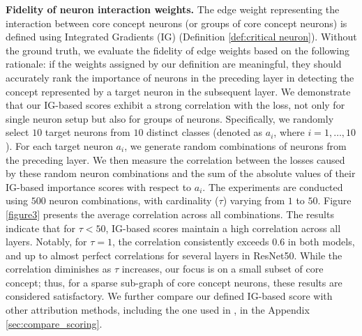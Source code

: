 \noindent \textbf{Fidelity of neuron interaction weights.}
\label{sec:edge_verification}
The edge weight representing the interaction between core concept neurons (or groups of core concept neurons) is defined using Integrated Gradients (IG) (Definition \ref{def:critical neuron}). Without the ground truth, we evaluate the fidelity of edge weights based on the following rationale: if the weights assigned by our definition are meaningful, they should accurately rank the importance of neurons in the preceding layer in detecting the concept represented by a target neuron in the subsequent layer.
We demonstrate that our IG-based scores exhibit a strong correlation with the loss, not only for single neuron setup but also for groups of neurons. Specifically, we randomly select $10$ target neurons from $10$ distinct classes (denoted as $a_i$, where $i = 1, \dots, 10$). For each target neuron $a_i$, we generate random combinations of neurons from the preceding layer. We then measure the correlation between the losses caused by these random neuron combinations and the sum of the absolute values of their IG-based importance scores with respect to $a_i$.
The experiments are conducted using $500$ neuron combinations, with cardinality ($\tau$) varying from $1$ to $50$. Figure \ref{figure3} presents the average correlation across all combinations. The results indicate that for $\tau < 50$, IG-based scores maintain a high correlation across all layers. Notably, for $\tau = 1$, the correlation consistently exceeds $0.6$ in both models, and up to almost perfect correlations for several layers in ResNet50.
While the correlation diminishes as $\tau$ increases, our focus is on a small subset of core concept; thus, for a sparse sub-graph of core concept neurons, these results are considered satisfactory. We further compare our defined IG-based score with other attribution methods, including the one used in \citet{NEUCEPT}, in the Appendix \ref{sec:compare_scoring}.

